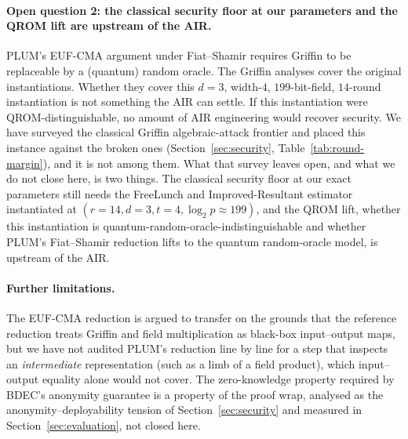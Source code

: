 \paragraph{Open question 2: the classical security floor at our parameters and the QROM lift are upstream of the AIR.}
PLUM's EUF-CMA argument under Fiat--Shamir requires Griffin to be replaceable by a (quantum) random oracle. The Griffin analyses cover the original instantiations. Whether they cover this $d=3$, width-$4$, $199$-bit-field, $14$-round instantiation is not something the AIR can settle. If this instantiation were QROM-distinguishable, no amount of AIR engineering would recover security. We have surveyed the classical Griffin algebraic-attack frontier and placed this instance against the broken ones (Section~\ref{sec:security}, Table~\ref{tab:round-margin}), and it is not among them. What that survey leaves open, and what we do not close here, is two things. The classical security floor at our exact parameters still needs the FreeLunch and Improved-Resultant estimator instantiated at $(r{=}14,d{=}3,t{=}4,\log_2 p\approx199)$, and the QROM lift, whether this instantiation is quantum-random-oracle-indistinguishable and whether PLUM's Fiat--Shamir reduction lifts to the quantum random-oracle model, is upstream of the AIR.

\paragraph{Further limitations.}
The EUF-CMA reduction is argued to transfer on the grounds that the reference reduction treats Griffin and field multiplication as black-box input--output maps, but we have not audited PLUM's reduction line by line for a step that inspects an \emph{intermediate} representation (such as a limb of a field product), which input--output equality alone would not cover. The zero-knowledge property required by BDEC's anonymity guarantee is a property of the proof wrap, analysed as the anonymity--deployability tension of Section~\ref{sec:security} and measured in Section~\ref{sec:evaluation}, not closed here.

